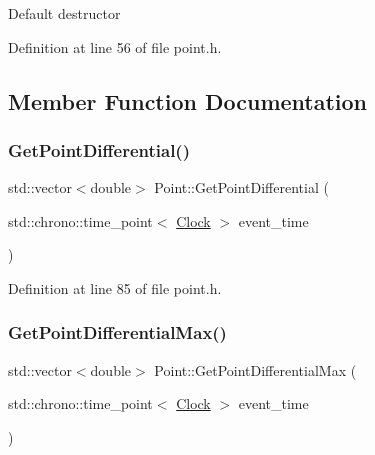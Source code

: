 Default destructor 

Definition at line 56 of file point.\+h.



\subsection{Member Function Documentation}
\mbox{\label{class_point_af3941d62b39234e468e201f25a37d9da}} 
\subsubsection{\texorpdfstring{Get\+Point\+Differential()}{GetPointDifferential()}}
{\footnotesize\ttfamily std\+::vector$<$double$>$ Point\+::\+Get\+Point\+Differential (\begin{DoxyParamCaption}\item[{std\+::chrono\+::time\+\_\+point$<$ \mbox{\hyperlink{universe_8h_a0ef8d951d1ca5ab3cfaf7ab4c7a6fd80}{Clock}} $>$}]{event\+\_\+time }\end{DoxyParamCaption})\hspace{0.3cm}{\ttfamily [inline]}}



Definition at line 85 of file point.\+h.

\mbox{\label{class_point_a326cd5742e908f8fb3cf6f3275b5462c}} 
\subsubsection{\texorpdfstring{Get\+Point\+Differential\+Max()}{GetPointDifferentialMax()}}
{\footnotesize\ttfamily std\+::vector$<$double$>$ Point\+::\+Get\+Point\+Differential\+Max (\begin{DoxyParamCaption}\item[{std\+::chrono\+::time\+\_\+point$<$ \mbox{\hyperlink{universe_8h_a0ef8d951d1ca5ab3cfaf7ab4c7a6fd80}{Clock}} $>$}]{event\+\_\+time }\end{DoxyParamCaption})\hspace{0.3cm}{\ttfamily [inline]}}



